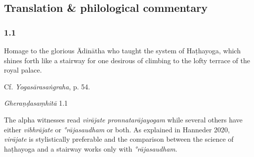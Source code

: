 


\pagestyle{HPed}
\begin{ekdosis}

\chapter*{Translation \& philological commentary}

\subsection*{1.1}
\begin{translation}[hp01_001]
Homage to the glorious Ādinātha who taught the system of Haṭhayoga, which shines forth like a stairway for one desirous of climbing to the lofty terrace of the royal palace.%
\end{translation}

\begin{testimonia}[hp01_001]
Cf. \emph{Yogasārasaṅgraha}, p. 54.

\begin{versinnote}
\end{versinnote}

\emph{Gheraṇḍasaṃhitā} 1.1

\begin{versinnote}
\end{versinnote}

\end{testimonia}

\begin{philcomm}[hp01_001]
The alpha witnesses read \emph{virājate pronnatarājayogam} while several others have either \emph{vibhrājate} or \emph{°rājasaudham} or both. As explained in Hanneder 2020, \emph{virājate} is stylistically preferable and the comparison between the science of haṭhayoga and a stairway works only with \emph{°rājasaudham}.


\end{philcomm}
\end{ekdosis}
